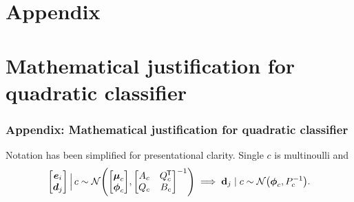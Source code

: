 \documentclass[8pt,handout]{beamer}
\theoremstyle{definition}
\theoremstyle{plain}
\theoremstyle{definition}
\theoremstyle{remark}
\numberwithin{equation}{section}
\numberwithin{figure}{section}
\numberwithin{table}{section}
\newcommand*{\tran}{^{\mkern-1.5mu\mathsf{T}}}
\begin{document}
\section{Appendix}

\appendix

\section{Mathematical justification for quadratic classifier}
\begin{frame}
    \frametitle{Appendix: Mathematical justification for quadratic classifier}
    \setlength{\abovedisplayshortskip}{0pt}
    \setlength{\belowdisplayshortskip}{0pt}
    Notation has been simplified for presentational clarity. Single \(c\)  is multinoulli and
    \[
        \mqty[\boldsymbol{e}_{i} \\ \boldsymbol{d}_{j}] \, \Big| \, c \sim \mathcal{N}\qty(\mqty[\boldsymbol{\mu}_{c} \\ \boldsymbol{\phi}_{c}], \mqty[A_{c} & Q_{c} \tran \\ Q_{c} & B_{c}]^{-1}) \implies \vb{d}_{j} \mid c \sim \mathcal{N}\qty(\boldsymbol{\phi}_{c}, P_{c}^{-1}).
    \]
    

\end{frame}
\end{document}
